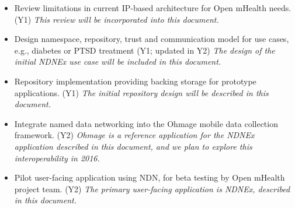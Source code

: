 \begin{itemize}
\item Review limitations in current IP-based architecture for Open mHealth needs. (Y1) \emph{This review will be incorporated into this document.} 
\item Design namespace, repository, trust and communication model for use cases, e.g., diabetes or PTSD treatment (Y1; updated in Y2) \emph{The design of the initial NDNEx use case will be included in this document.} 
\item Repository implementation providing backing storage for prototype applications. (Y1) \emph{The initial repository design will be described in this document.}
\item Integrate named data networking into the Ohmage mobile data collection framework. (Y2) \emph{Ohmage is a reference application for the NDNEx application described in this document, and we plan to explore this interoperability in 2016.}
\item Pilot user-facing application using NDN, for beta testing by Open mHealth project team. (Y2) \emph{The primary user-facing application is NDNEx, described in this document.} 
\end{itemize}






